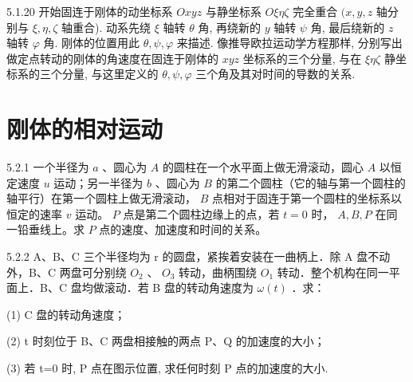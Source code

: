 \begin{problem}{5.1.20}
开始固连于刚体的动坐标系 $Oxyz$ 与静坐标系 $O\xi \eta \zeta$ 完全重合 $(x, y, z$ 轴分别与 $\xi, \eta, \zeta$ 轴重合). 动系先绕 $\xi$ 轴转 $\theta$ 角, 再绕新的 $y$ 轴转 $\psi$ 角, 最后绕新的 $z$ 轴转 $\varphi$ 角. 刚体的位置用此 $\theta, \psi, \varphi$ 来描述. 像推导欧拉运动学方程那样, 分别写出做定点转动的刚体的角速度在固连于刚体的 $xyz$ 坐标系的三个分量, 与在 $\xi \eta \zeta$ 静坐标系的三个分量, 与这里定义的 $\theta, \psi, \varphi$ 三个角及其对时间的导数的关系.
\end{problem}
\clearpage


\section{刚体的相对运动}

\begin{problem}{5.2.1}
一个半径为 $a$ 、圆心为 $A$ 的圆柱在一个水平面上做无滑滚动，圆心 $A$ 以恒定速度 $u$ 运动；另一半径为 $b$ 、圆心为 $B$ 的第二个圆柱（它的轴与第一个圆柱的轴平行）在第一个圆柱上做无滑滚动， $B$ 点相对于固连于第一个圆柱的坐标系以恒定的速率 $v$ 运动。 $P$ 点是第二个圆柱边缘上的点，若 $t = 0$ 时， $A, B, P$ 在同一铅垂线上。求 $P$ 点的速度、加速度和时间的关系。
\end{problem}
\clearpage


\begin{problem}{5.2.2}
A、B、C 三个半径均为 r 的圆盘，紧挨着安装在一曲柄上．除 A 盘不动外，B、C 两盘可分别绕 $O_{2}$ 、 $O_{3}$ 转动，曲柄围绕 $O_{1}$ 转动．整个机构在同一平面上．B、C 盘均做滚动．若 B 盘的转动角速度为 $\omega(t)$ ．求：

(1) C 盘的转动角速度；

(2) t 时刻位于 B、C 两盘相接触的两点 P、Q 的加速度的大小；

(3) 若 t=0 时, P 点在图示位置, 求任何时刻 P 点的加速度的大小.
\begin{center}

\end{center}
\end{problem}
\clearpage


